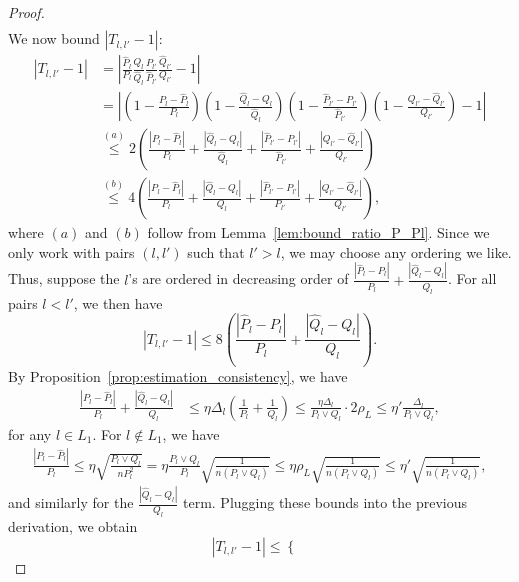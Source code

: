 \documentclass{article}
\begin{document}
\begin{proof}
\begin{align}
\end{align}
We now bound $|T_{l,l'} - 1|$:
\begin{align*}
|T_{l,l'} - 1| &= \left| \frac{\hat{P}_l}{P_l} \frac{Q_l}{\hat{Q}_l} 
      \frac{P_{l'}}{\hat{P}_{l'}} \frac{\hat{Q}_{l'}}{Q_{l'}} - 1 \right| \\
 &= \left| \left( 1 - \frac{P_l - \hat{P}_l}{P_l} \right)
    \left( 1 - \frac{\hat{Q}_l - Q_l}{\hat{Q}_l} \right)
   \left( 1- \frac{\hat{P}_{l'} - P_{l'}}{\hat{P}_{l'}}\right)
   \left( 1 -  \frac{Q_{l'}- \hat{Q}_{l'}}{Q_{l'}} \right) -1 \right| \\
&\stackrel{(a)} \leq 2\left( \frac{|P_l - \hat{P}_l|}{P_l} +  \frac{|\hat{Q}_l - Q_l|}{\hat{Q}_l}
           +   \frac{| \hat{P}_{l'} - P_{l'}|}{\hat{P}_{l'}} +
               \frac{| Q_{l'} - \hat{Q}_{l'} | }{Q_{l'}} \right) \\
&\stackrel{(b)} \leq 4\left( \frac{|P_l - \hat{P}_l|}{P_l} +  \frac{|\hat{Q}_l - Q_l|}{Q_l}
           +   \frac{| \hat{P}_{l'} - P_{l'}|}{P_{l'}} +
               \frac{| Q_{l'} - \hat{Q}_{l'} | }{Q_{l'}} \right), 
\end{align*}
where $(a)$ and $(b)$ follow from Lemma~\ref{lem:bound_ratio_P_Pl}. Since we only work with pairs $(l, l')$ such that $l' > l$, we may choose any ordering we like. Thus, suppose the $l$'s are ordered in decreasing order of $\frac{|\hat{P}_l - P_l|}{P_l} + \frac{|\hat{Q}_l - Q_l|}{Q_l}$. For all pairs $l < l'$, we then have
\[
| T_{l,l'} - 1 | \leq 8
    \left( \frac{|\hat{P}_l - P_l|}{P_l} + \frac{|\hat{Q}_l - Q_l|}{Q_l} \right).
\]
By Proposition~\ref{prop:estimation_consistency}, we have
\begin{align*}
\frac{|P_l - \hat{P}_l|}{P_l} + \frac{|\hat{Q}_l - Q_l|}{Q_l} &\leq \eta \Delta_l \left(\frac{1}{P_l} + \frac{1}{Q_l}\right)
\leq \frac{\eta \Delta_l}{P_l \vee Q_l} \cdot 2\rho_L
\leq \eta' \frac{\Delta_l}{P_l \vee Q_l},
\end{align*}
for any $l \in L_1$. For $l \notin L_1$, we have
\begin{align*}
\frac{|P_l - \hat{P}_l|}{P_l} \leq \eta \sqrt{\frac{P_l \vee Q_l}{n P_l^2}} = \eta \frac{P_l \vee Q_l}{P_l} \sqrt{\frac{1}{n(P_l \vee Q_l)}} \leq \eta \rho_L \sqrt{\frac{1}{n(P_l \vee Q_l)}} \leq \eta' \sqrt{\frac{1}{n(P_l \vee Q_l)}},
\end{align*}
and similarly for the $\frac{|\hat{Q}_l - Q_l|}{Q_l}$ term. Plugging these bounds into the previous derivation, we obtain
\begin{equation*}
|T_{l,l'} - 1| \leq \begin{cases}

\end{cases}
\end{equation*}
\end{proof}
\end{document}
